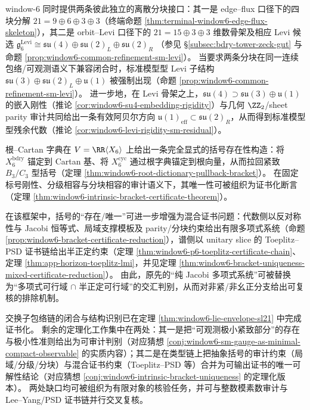 \begin{remark}\label{rem:window6-two-skeletons-to-sm-residual}
window-\(6\) 同时提供两条彼此独立的离散分块接口：其一是 edge--flux 口径下的四块分解 \(21=9\oplus 6\oplus 3\oplus 3\)（终端命题 \ref{thm:terminal-window6-edge-flux-skeleton}），其二是 orbit--Levi 口径下的 \(21=15\oplus 3\oplus 3\) 维数骨架及相应 Levi 候选
\(
\mathfrak g^{\mathrm{Levi}}_6\cong \mathfrak{su}(4)\oplus\mathfrak{su}(2)_L\oplus\mathfrak{su}(2)_R
\)
（参见 \S\ref{subsec:bdry-tower-zeck-gut} 与命题 \ref{prop:window6-common-refinement-sm-levi}）。
当要求两条分块在同一连续包络/可观测语义下兼容闭合时，标准模型型 Levi 子结构
\(
\mathfrak{su}(3)\oplus\mathfrak{su}(2)_L\oplus\mathfrak u(1)
\)
被强制出现（命题 \ref{prop:window6-common-refinement-sm-levi}）。
进一步地，在 Levi 骨架之上，\(\mathfrak{su}(4)\supset\mathfrak{su}(3)\oplus\mathfrak u(1)\) 的嵌入刚性（推论 \ref{cor:window6-su4-embedding-rigidity}）与几何 \(\ZZ_2\)/sheet parity 审计共同给出一条有效阿贝尔方向 \(\mathfrak u(1)_{\mathrm{eff}}\subset\mathfrak{su}(2)_R\)，从而得到标准模型型残余代数（推论 \ref{cor:window6-levi-rigidity-sm-residual}）。
\end{remark}

\begin{remark}\label{rem:window6-bracket-theoremization-route}
根--Cartan 字典在 \(V=\RR\langle X_6\rangle\) 上给出一条完全显式的括号存在性构造：将 \(X_6^{\mathrm{bdry}}\) 锚定到 Cartan 基、将 \(X_6^{\mathrm{cyc}}\) 通过根字典锚定到根向量，从而拉回紧致 \(B_3/C_3\) 型括号（定理 \ref{thm:window6-root-dictionary-pullback-bracket}）。
在固定标号刚性、分级相容与分块相容的审计语义下，其唯一性可被组织为证书化断言（定理 \ref{thm:window6-intrinsic-bracket-certificate-theorem}）。
\par
在该框架中，括号的“存在/唯一”可进一步增强为混合证书问题：代数侧以反对称性与 Jacobi 恒等式、局域支撑模板及 parity/分块约束给出有限多项式系统（命题 \ref{prop:window6-bracket-certificate-reduction}），谱侧以 unitary slice 的 Toeplitz--PSD 证书链给出半正定约束（定理 \ref{thm:window6-p6-toeplitz-certificate-chain}、定理 \ref{thm:app-horizon-toeplitz-lmi}，并见定理 \ref{thm:window6-bracket-uniqueness-mixed-certificate-reduction}）。
由此，原先的“纯 Jacobi 多项式系统”可被替换为“多项式可行域 \(\cap\) 半正定可行域”的交汇判别，从而对非紧/非幺正分支给出可复核的排除机制。
\end{remark}

\begin{remark}\label{rem:window6-10-170-10-172-gaps}
交换子包络链的闭合与结构识别已在定理 \ref{thm:window6-lie-envelope-sl21} 中完成证书化。
剩余的定理化工作集中在两处：其一是把“可观测极小紧致部分”的存在与极小性准则给出为可审计判别（对应猜想 \ref{conj:window6-sm-gauge-as-minimal-compact-observable} 的实质内容）；其二是在类型链上把抽象括号的审计约束（局域/分级/分块）与混合证书约束（Toeplitz--PSD 等）合并为可输出证书的唯一可解性结论（对应猜想 \ref{conj:window6-intrinsic-bracket-uniqueness} 的定理化版本）。
两处缺口均可被组织为有限对象的核验任务，并可与整数模素数审计与 Lee--Yang/PSD 证书链并行交叉复核。
\end{remark}


